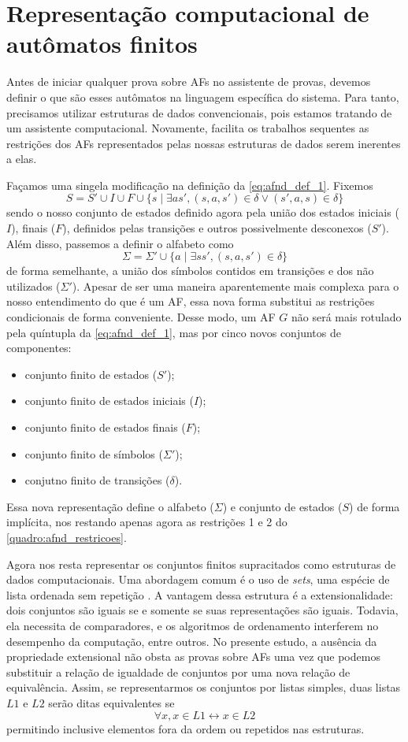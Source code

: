 \section{Representação computacional de autômatos finitos}

Antes de iniciar qualquer prova sobre AFs no assistente de provas, devemos definir o que são esses autômatos na linguagem específica do sistema. Para tanto, precisamos utilizar estruturas de dados convencionais, pois estamos tratando de um assistente computacional. Novamente, facilita os trabalhos sequentes as restrições dos AFs representados pelas nossas estruturas de dados serem inerentes a elas.

Façamos uma singela modificação na definição da \autoref{eq:afnd_def_1}. Fixemos $$S = S' \cup I \cup F \cup \{ s \mid \exists a s', (s, a, s') \in \delta \vee (s', a, s) \in \delta \}$$ sendo o nosso conjunto de estados definido agora pela união dos estados iniciais ($I$), finais ($F$), definidos pelas transições e outros possivelmente desconexos ($S'$). Além disso, passemos a definir o alfabeto como $$\Sigma = \Sigma' \cup \{ a \mid \exists s s', (s, a, s') \in \delta \}$$ de forma semelhante, a união dos símbolos contidos em transições e dos não utilizados ($\Sigma'$). Apesar de ser uma maneira aparentemente mais complexa para o nosso entendimento do que é um AF, essa nova forma substitui as restrições condicionais de forma conveniente. Desse modo, um AF $G$ não será mais rotulado pela quíntupla da \autoref{eq:afnd_def_1}, mas por cinco novos conjuntos de componentes: \begin{itemize}
  \item conjunto finito de estados ($S'$);
  \item conjunto finito de estados iniciais ($I$);
  \item conjunto finito de estados finais ($F$);
  \item conjunto finito de símbolos ($\Sigma'$);
  \item conjutno finito de transições ($\delta$).
\end{itemize} Essa nova representação define o alfabeto ($\Sigma$) e conjunto de estados ($S$) de forma implícita, nos restando apenas agora as restrições 1 e 2 do \autoref{quadro:afnd_restricoes}.

Agora nos resta representar os conjuntos finitos supracitados como estruturas de dados computacionais. Uma abordagem comum é o uso de \textit{sets}, uma espécie de lista ordenada sem repetição \cite{blot2016sets}. A vantagem dessa estrutura é a extensionalidade: dois conjuntos são iguais se e somente se suas representações são iguais. Todavia, ela necessita de comparadores, e os algoritmos de ordenamento interferem no desempenho da computação, entre outros. No presente estudo, a ausência da propriedade extensional não obsta as provas sobre AFs uma vez que podemos substituir a relação de igualdade de conjuntos por uma nova relação de equivalência. Assim, se representarmos os conjuntos por listas simples, duas listas $L1$ e $L2$ serão ditas equivalentes se $$\forall x, x \in L1 \leftrightarrow x \in L2$$ permitindo inclusive elementos fora da ordem ou repetidos nas estruturas.

